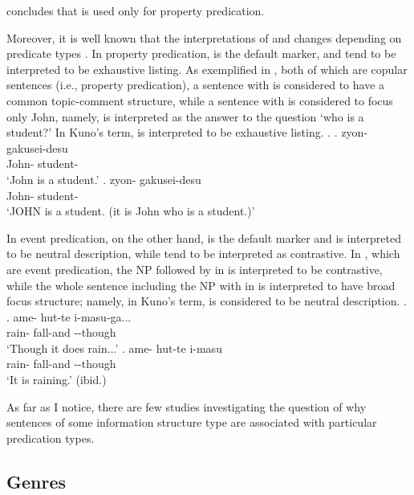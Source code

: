  concludes that
 is used only for property predication.

Moreover, it is well known that
the interpretations of  and  changes
depending on predicate types \cite{kuroda72,kuno73}.
In property predication,
 is the default marker, and
 tend to be interpreted to be exhaustive listing.
As exemplified in \Next[a-b], both of which are copular sentences (i.e., property predication),
a sentence with  \Next[a] is considered to have a common topic-comment structure,
while a sentence with  \Next[b] is considered to focus only John,
namely, \Next[b] is interpreted as the answer to the question `who is a student?'
In Kuno's term,
 is interpreted to be exhaustive listing.
%
\ex.
 \ag. zyon- gakusei-desu \\
      John- student- \\
      `John is a student.'
 \bg. zyon- gakusei-desu \\
      John- student- \\
      `JOHN is a student. (it is John who is a student.)'
      \hfill{\cite[38]{kuno73}}

In event predication,
on the other hand,
 is the default marker and is interpreted to be neutral description,
while  tend to be interpreted as contrastive.
In \Next[a-b], which are event predication,
the NP followed by  in \Next[a] is interpreted to be contrastive,
while the whole sentence including the NP with  in \Next[b] is interpreted to have broad focus structure;
namely, in Kuno's term,
 is considered to be neutral description.
%
\ex.
 \ag. ame- hut-te i-masu-ga... \\
      rain- fall-and --though \\
      `Though it does rain...'
 \bg. ame- hut-te i-masu \\
      rain- fall-and --though \\
      `It is raining.'
      \hfill{(ibid.)}


As far as I notice,
there are few studies investigating the question of
why sentences of some information structure type are associated with
particular predication types.



\subsection{Genres}

